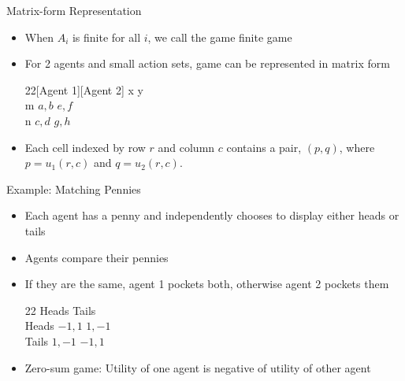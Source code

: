 \documentclass[11pt,aspectratio=169,handout]{beamer}
\begin{document}
  \begin{frame}{Matrix-form Representation}
   \begin{itemize}[<+->]
    \item When $A_i$ is finite for all $i$, we call the game \alert{finite game}
    \item For 2 agents and small action sets, game can be represented in \alert{matrix form}
    \vspace{0.7em}
    \begin{center}
     \hspace{-5.6em}
     \begin{game}{2}{2}[Agent 1][Agent 2]
      		\> x			\>	y			\\
      m	\>	$a,b$\>	$e,f$	\\
      n	\>	$c,d$	\>	$g,h$
     \end{game}
    \end{center}
    \vspace{0.7em}
    \item Each cell indexed by  row $r$ and column $c$ contains a pair, $(p,q)$, where $p = u_1(r,c)$ and $q = u_2(r,c)$.
   \end{itemize}
  \end{frame}
 
  \begin{frame}{Example: Matching Pennies}
   \begin{itemize}
    \item Each agent has a penny and independently chooses to display either heads or tails
    \item Agents compare their pennies
    \item<+-> If they are the same, agent 1 pockets both, otherwise agent 2 pockets them
    \begin{center}
     \hspace{-3.5em}
     \begin{game}{2}{2}
      		\> Heads		\> Tails		\\
      Heads	\> $-1,1$	\> $1,-1$	\\
      Tails	\> $1,-1$	\> $-1,1$
     \end{game}
    \end{center}
    \vspace{0.7em}
    \item<+-> \alert{Zero-sum game}: Utility of one agent is negative of utility of other agent
   \end{itemize}
  \end{frame}
\end{document}

